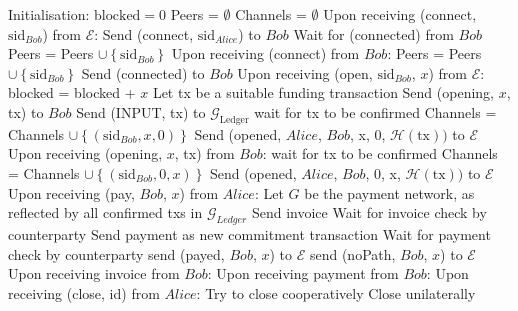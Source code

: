 \begin{algorithm}
  \caption{$\Pi_{\mathrm{LN}}$}
  \label{alg:lightningprot}
  \begin{algorithmic}[1]
    \State Initialisation:
      \State $\mathrm{blocked} = 0$
      \State Peers = $\emptyset$
      \State Channels = $\emptyset$
    \State
    \State Upon receiving (connect, $\mathrm{sid}_{Bob}$) from $\mathcal{E}$:
      \State Send (connect, $\mathrm{sid}_{Alice}$) to $Bob$ 
      \State Wait for (connected) from $Bob$
      \State Peers = Peers $\cup \left\{\mathrm{sid}_{Bob}\right\}$
    \State
    \State Upon receiving (connect) from $Bob$:
      \State Peers = Peers $\cup \left\{\mathrm{sid}_{Bob}\right\}$
      \State Send (connected) to $Bob$
    \State
    \State Upon receiving (open, $\mathrm{sid}_{Bob}$, $x$) from $\mathcal{E}$:
        \State blocked = blocked + $x$
        \State Let tx be a suitable funding transaction
        \State Send (opening, $x$, tx) to $Bob$
        \State Send (INPUT, tx) to $\mathcal{G}_{\mathrm{Ledger}}$
        \State wait for tx to be confirmed 
        \State Channels = Channels $\cup \left\{\left(\mathrm{sid}_{Bob},
        x, 0\right)\right\}$
        \State Send (opened, $Alice$, $Bob$, x, 0, $\mathcal{H}\left(\mathrm{tx}\right))$
        to $\mathcal{E}$
      \EndIf
    \State
    \State Upon receiving (opening, $x$, tx) from $Bob$:
      \State wait for tx to be confirmed
      \State Channels = Channels $\cup \left\{\left(\mathrm{sid}_{Bob}, 0,
      x\right)\right\}$
      \State Send (opened, $Alice$, $Bob$, 0, x, $\mathcal{H}\left(\mathrm{tx}\right))$ to
      $\mathcal{E}$
    \State
    \State Upon receiving (pay, $Bob$, $x$) from $Alice$:
      \State Let $G$ be the payment network, as reflected by all confirmed txs in
      $\mathcal{G}_{Ledger}$
        \State Send invoice
        \State Wait for invoice check by counterparty
        \State Send payment as new commitment transaction 
        \State Wait for payment check by counterparty
        \State send (payed, $Bob$, $x$) to $\mathcal{E}$
      \Else
        \State send (noPath, $Bob$, $x$) to $\mathcal{E}$
      \EndIf
    \State
    \State Upon receiving invoice from $Bob$: 
    \State
    \State Upon receiving payment from $Bob$: 
    \State
    \State Upon receiving (close, id) from $Alice$:
      \State Try to close cooperatively 
       
        \State Close unilaterally 
      \EndIf
    \EndIf
  \end{algorithmic}
\end{algorithm}

